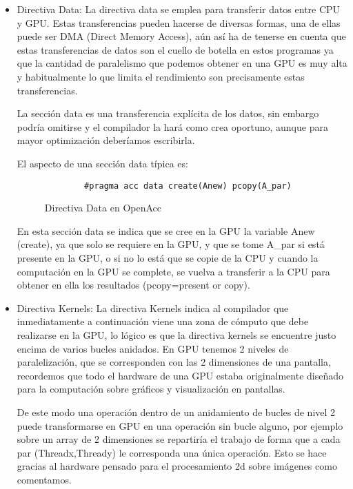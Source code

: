 \begin{itemize}

\item Directiva Data: La directiva data se emplea para transferir datos entre CPU y GPU. Estas transferencias pueden hacerse de diversas formas, una de ellas puede ser DMA (Direct Memory Access), aún así ha de tenerse en cuenta que estas transferencias de datos son el cuello de botella en estos programas ya que la cantidad de paralelismo que podemos obtener en una GPU es muy alta y habitualmente lo que limita el rendimiento son precisamente estas transferencias.

 La sección data es una transferencia explícita de los datos, sin embargo podría omitirse y el compilador la hará como crea oportuno, aunque para mayor optimización deberíamos escribirla.
 
 El aspecto de una sección data típica es:
 
 \begin{figure}[tph]
 \begin{lstlisting}
		#pragma acc data create(Anew) pcopy(A_par)
\end{lstlisting}
\caption{Directiva Data en OpenAcc}
\label{FIG:DataOpenAcc}
\end{figure}


En esta sección data se indica que se cree en la GPU la variable Anew (create), ya que solo se requiere en la GPU, y que se tome A\_par si está presente en la GPU, o si no lo está que se copie de la CPU y cuando la computación en la GPU se complete, se vuelva a transferir a la CPU para obtener en ella los resultados (pcopy=present or copy).

\item Directiva Kernels: La directiva Kernels indica al compilador que inmediatamente a continuación viene una zona de cómputo que debe realizarse en la GPU, lo lógico es que la directiva kernels se encuentre justo encima de varios bucles anidados. En GPU tenemos 2 niveles de paralelización, que se corresponden con las 2 dimensiones de una pantalla, recordemos que todo el hardware de una GPU estaba originalmente diseñado para la computación sobre gráficos y visualización en pantallas.

De este modo una operación dentro de un anidamiento de bucles de nivel 2 puede transformarse en GPU en una operación sin bucle alguno, por ejemplo sobre un array de 2 dimensiones se repartiría el trabajo de forma que a cada par (Threadx,Thready) le corresponda una única operación. Esto se hace gracias al hardware pensado para el procesamiento 2d sobre imágenes como comentamos.


\end{itemize}
